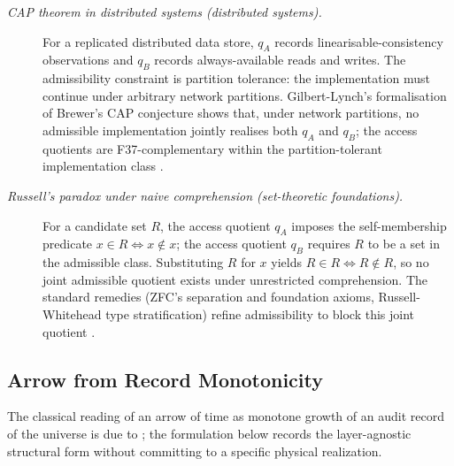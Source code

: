 \documentclass[11pt]{article}
\theoremstyle{definition}
\begin{document}
\begin{description}
\item[\emph{{CAP} theorem in distributed systems
(distributed systems).}]
For a replicated distributed data store, \(q_A\)
records linearisable-consistency observations and
\(q_B\) records always-available reads and writes.
The admissibility constraint is partition tolerance:
the implementation must continue under arbitrary
network partitions.  Gilbert-Lynch's formalisation of
Brewer's CAP conjecture shows that, under network
partitions, no admissible implementation jointly
realises both \(q_A\) and \(q_B\); the access
quotients are F37-complementary within the
partition-tolerant implementation class
\citep{GilbertLynch2002CAP}.

\item[\emph{Russell's paradox under naive
comprehension (set-theoretic foundations).}]
For a candidate set \(R\), the access quotient
\(q_A\) imposes the self-membership predicate
\(x\in R\iff x\notin x\); the access quotient
\(q_B\) requires \(R\) to be a set in the admissible
class.  Substituting \(R\) for \(x\) yields
\(R\in R\iff R\notin R\), so no joint admissible
quotient exists under unrestricted comprehension.
The standard remedies (ZFC's separation and
foundation axioms, Russell-Whitehead type
stratification) refine admissibility to block this
joint quotient \citep{Russell1902Letter}.
\end{description}

\subsection{Arrow from Record Monotonicity}\label{sec:self-reference-limits:arrow}

The classical reading of an arrow of time as monotone growth of an
audit record of the universe is due to \citet{Eddington1928Nature};
the formulation below records the layer-agnostic structural form
without committing to a specific physical realization.
\end{document}
